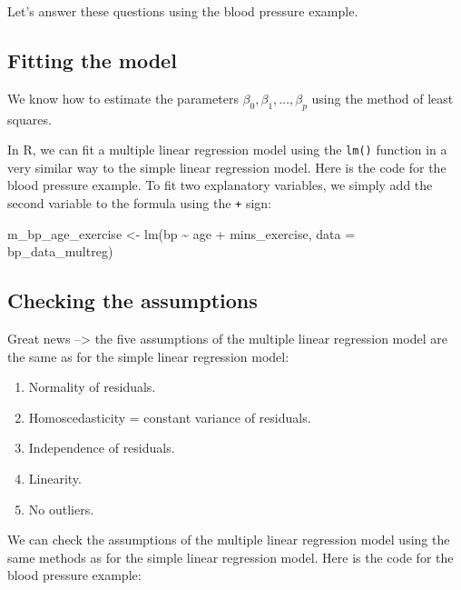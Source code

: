 \documentclass[
  letterpaper,
  8pt,
  a4paper]{book}
\newenvironment{Shaded}{\begin{snugshade}}{\end{snugshade}}
\newcommand{\AttributeTok}[1]{\textcolor[rgb]{0.40,0.45,0.13}{#1}}
\newcommand{\FunctionTok}[1]{\textcolor[rgb]{0.28,0.35,0.67}{#1}}
\newcommand{\NormalTok}[1]{\textcolor[rgb]{0.00,0.23,0.31}{#1}}
\newcommand{\OtherTok}[1]{\textcolor[rgb]{0.00,0.23,0.31}{#1}}
\newcommand{\SpecialCharTok}[1]{\textcolor[rgb]{0.37,0.37,0.37}{#1}}
\providecommand{\tightlist}{%
  \setlength{\itemsep}{0pt}\setlength{\parskip}{0pt}}
\begin{document}
Let's answer these questions using the blood pressure example.

\subsection*{Fitting the model}\label{fitting-the-model}

We know how to estimate the parameters
\(\beta_0, \beta_1, \ldots, \beta_p\) using the method of least squares.

In R, we can fit a multiple linear regression model using the
\texttt{lm()} function in a very similar way to the simple linear
regression model. Here is the code for the blood pressure example. To
fit two explanatory variables, we simply add the second variable to the
formula using the \texttt{+} sign:

\begin{Shaded}
\begin{Highlighting}[]
\NormalTok{m\_bp\_age\_exercise }\OtherTok{\textless{}{-}} \FunctionTok{lm}\NormalTok{(bp }\SpecialCharTok{\textasciitilde{}}\NormalTok{ age }\SpecialCharTok{+}\NormalTok{ mins\_exercise, }\AttributeTok{data =}\NormalTok{ bp\_data\_multreg)}
\end{Highlighting}
\end{Shaded}

\subsection*{Checking the assumptions}\label{checking-the-assumptions}

Great news --\textgreater{} the five assumptions of the multiple linear
regression model are the same as for the simple linear regression model:

\begin{enumerate}
\def\labelenumi{\alph{enumi})}
\tightlist
\item
  Normality of residuals.
\item
  Homoscedasticity = constant variance of residuals.
\item
  Independence of residuals.
\item
  Linearity.
\item
  No outliers.
\end{enumerate}

We can check the assumptions of the multiple linear regression model
using the same methods as for the simple linear regression model. Here
is the code for the blood pressure example:
\end{document}
